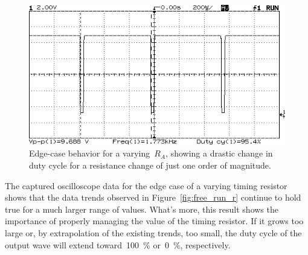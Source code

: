 \begin{figure}[H]
	\centering
	\includegraphics[width=.6\textwidth]{img/shot/shot3.png}
	\parbox{.6\textwidth}{
	\caption[Free Running Oscillator --- Varying $R_A$ at \SI{95.2}{\percent}
	Duty Cycle]{Edge-case behavior for a varying~$R_A$, showing a drastic
	change in duty cycle for a resistance change of just one order of
	magnitude.}
	\label{fig:shot3}}
\end{figure}
%
The captured oscilloscope data for the edge case of a varying timing resistor
shows that the data trends observed in Figure~\ref{fig:free_run_r} continue to
hold true for a much larger range of values.  What's more, this result shows
the importance of properly managing the value of the timing resistor.  If it
grows too large or, by extrapolation of the existing trends, too small, the
duty cycle of the output wave will extend toward~\SI{100}{\percent}
or~\SI{0}{\percent}, respectively.


